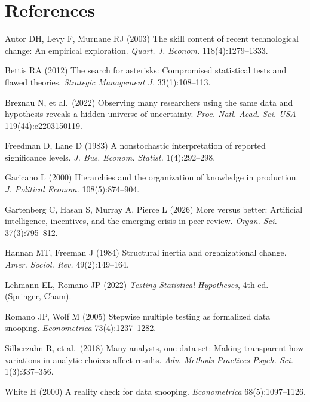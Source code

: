 \documentclass[11pt]{article}
\begin{document}
\section*{References}
{\small
Autor DH, Levy F, Murnane RJ (2003) The skill content of recent technological change: An empirical exploration. \textit{Quart. J. Econom.} 118(4):1279--1333.\par
Bettis RA (2012) The search for asterisks: Compromised statistical tests and flawed theories. \textit{Strategic Management J.} 33(1):108--113.\par
Breznau N, et al.\ (2022) Observing many researchers using the same data and hypothesis reveals a hidden universe of uncertainty. \textit{Proc. Natl. Acad. Sci. USA} 119(44):e2203150119.\par
Freedman D, Lane D (1983) A nonstochastic interpretation of reported significance levels. \textit{J. Bus. Econom. Statist.} 1(4):292--298.\par
Garicano L (2000) Hierarchies and the organization of knowledge in production. \textit{J. Political Econom.} 108(5):874--904.\par
Gartenberg C, Hasan S, Murray A, Pierce L (2026) More versus better: Artificial intelligence, incentives, and the emerging crisis in peer review. \textit{Organ. Sci.} 37(3):795--812.\par
Hannan MT, Freeman J (1984) Structural inertia and organizational change. \textit{Amer. Sociol. Rev.} 49(2):149--164.\par
Lehmann EL, Romano JP (2022) \textit{Testing Statistical Hypotheses}, 4th ed. (Springer, Cham).\par
Romano JP, Wolf M (2005) Stepwise multiple testing as formalized data snooping. \textit{Econometrica} 73(4):1237--1282.\par
Silberzahn R, et al.\ (2018) Many analysts, one data set: Making transparent how variations in analytic choices affect results. \textit{Adv. Methods Practices Psych. Sci.} 1(3):337--356.\par
White H (2000) A reality check for data snooping. \textit{Econometrica} 68(5):1097--1126.\par
}
\end{document}
